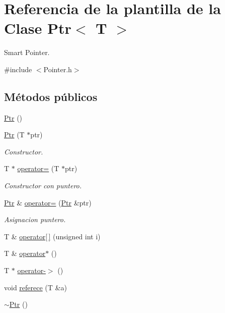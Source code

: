 \hypertarget{classPtr}{
\section{\-Referencia de la plantilla de la \-Clase \-Ptr$<$ \-T $>$}
\label{classPtr}
}


\-Smart \-Pointer.  




{\ttfamily \#include $<$\-Pointer.\-h$>$}

\subsection*{\-Métodos públicos}
\begin{DoxyCompactItemize}
\item 
\hyperlink{classPtr_ad0494ebf61bd0b8f8edefdb1e44951d5}{\-Ptr} ()
\item 
\hyperlink{classPtr_a38747081c8acd37350efa0fd636ea84f}{\-Ptr} (\-T $\ast$ptr)
\begin{DoxyCompactList}\small\item\em \-Constructor. \end{DoxyCompactList}\item 
\-T $\ast$ \hyperlink{classPtr_ab3d840c6f6a9fd7ae85e1dcd9e33c6ff}{operator=} (\-T $\ast$ptr)
\begin{DoxyCompactList}\small\item\em \-Constructor con puntero. \end{DoxyCompactList}\item 
\hyperlink{classPtr}{\-Ptr} \& \hyperlink{classPtr_ae6fd0aba0b36ccba7e3c3bb7d02d24fe}{operator=} (\hyperlink{classPtr}{\-Ptr} \&ptr)
\begin{DoxyCompactList}\small\item\em \-Asignacion puntero. \end{DoxyCompactList}\item 
\-T \& \hyperlink{classPtr_a2c1e44bcaf7292e77d27cb0078113531}{operator\mbox{[}$\,$\mbox{]}} (unsigned int i)
\item 
\-T \& \hyperlink{classPtr_a11f526dc803d2720ece6498bc74bee40}{operator$\ast$} ()
\item 
\-T $\ast$ \hyperlink{classPtr_aeee91b1dbe1a2218b163222eec8b8c33}{operator-\/$>$} ()
\item 
void \hyperlink{classPtr_ab29f310db82249feaea036e359e81891}{referece} (\-T \&a)
\item 
\hyperlink{classPtr_a1abc73b5113c9dd340fbae70f479d2ef}{$\sim$\-Ptr} ()
\end{DoxyCompactItemize}


